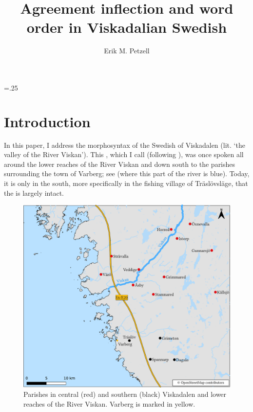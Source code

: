 \documentclass[output=paper,colorlinks,citecolor=brown,draft,draftmode]{langscibook}
\author{Erik M. Petzell\affiliation{Institute for Language and Folklore, Gothenburg}}
\title{Agreement inflection and word order in Viskadalian Swedish}
\begin{document}
\multicolsep=.25\baselineskip
\maketitle


\section{Introduction}\label{sec:petzell:1}


In this paper, I address the morphosyntax of the Swedish  of Viskadalen (lit. ‘the valley of the River Viskan’). This , which I call  (following \citealt{Petzell2017}), was once spoken all around the lower reaches of the River Viskan and down south to the parishes surrounding the town of Varberg; see  (where this part of the river is blue). Today, it is only in the south, more specifically in the fishing village of Träslövsläge, that the  is largely intact. 

\begin{figure}
\includegraphics[width=\textwidth]{figures/lmswe-latest-compressed.pdf}
\caption{\label{figmap:petzell:1}\label{figmap:petzell:2}Parishes in central (red) and southern (black) Viskadalen and lower reaches of the River Viskan. Varberg is marked in yellow.}
\end{figure}
\end{document}
